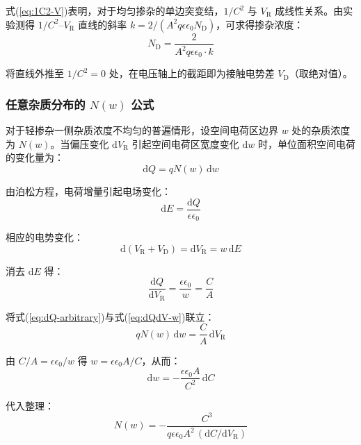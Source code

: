 式(\ref{eq:1C2-V})表明，对于均匀掺杂的单边突变结，$1/C^{2}$ 与 $V_{\mathrm{R}}$ 成线性关系。由实验测得 $1/C^{2}$--$V_{\mathrm{R}}$ 直线的斜率 $k = 2/(A^{2}q\epsilon\epsilon_0 N_{\mathrm{D}})$，可求得掺杂浓度：
\begin{equation}
N_{\mathrm{D}} = \frac{2}{A^{2}q\epsilon\epsilon_0 \cdot k}
\end{equation}

将直线外推至 $1/C^{2} = 0$ 处，在电压轴上的截距即为接触电势差 $V_{\mathrm{D}}$（取绝对值）。

\subsubsection{任意杂质分布的 $N(w)$ 公式}

对于轻掺杂一侧杂质浓度不均匀的普遍情形，设空间电荷区边界 $w$ 处的杂质浓度为 $N(w)$。当偏压变化 $\mathrm{d}V_{\mathrm{R}}$ 引起空间电荷区宽度变化 $\mathrm{d}w$ 时，单位面积空间电荷的变化量为：
\begin{equation}\label{eq:dQ-arbitrary}
\mathrm{d}Q = qN(w)\,\mathrm{d}w
\end{equation}

由泊松方程，电荷增量引起电场变化：
\begin{equation}
\mathrm{d}E = \frac{\mathrm{d}Q}{\epsilon\epsilon_0}
\end{equation}

相应的电势变化：
\begin{equation}
\mathrm{d}(V_{\mathrm{R}} + V_{\mathrm{D}}) = \mathrm{d}V_{\mathrm{R}} = w\,\mathrm{d}E
\end{equation}

消去 $\mathrm{d}E$ 得：
\begin{equation}\label{eq:dQdV-w}
\frac{\mathrm{d}Q}{\mathrm{d}V_{\mathrm{R}}} = \frac{\epsilon\epsilon_0}{w} = \frac{C}{A}
\end{equation}

将式(\ref{eq:dQ-arbitrary})与式(\ref{eq:dQdV-w})联立：
\begin{equation}
qN(w)\,\mathrm{d}w = \frac{C}{A}\,\mathrm{d}V_{\mathrm{R}}
\end{equation}

由 $C/A = \epsilon\epsilon_0/w$ 得 $w = \epsilon\epsilon_0 A/C$，从而：
\begin{equation}
\mathrm{d}w = -\frac{\epsilon\epsilon_0 A}{C^{2}}\,\mathrm{d}C
\end{equation}

代入整理：
\begin{equation}\label{eq:Nw-C}
N(w) = -\frac{C^{3}}{q\epsilon\epsilon_0 A^{2}\,(\mathrm{d}C/\mathrm{d}V_{\mathrm{R}})}
\end{equation}

